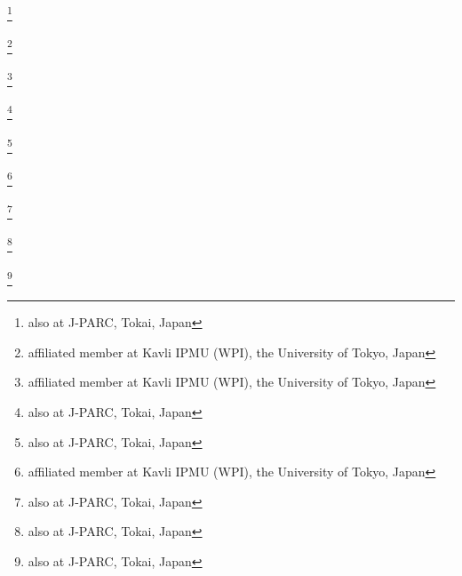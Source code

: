 \author{S.\,Kumaratunga}\INSTB
\author{R.\,Kurjata}\INSTDH
\author{T.\,Kutter}\INSTFI
\author{J.\,Lagoda}\INSTDF
\author{K.\,Laihem}\INSTBC
\author{I.\,Lamont}\INSTEJ
\author{E.\,Larkin}\INSTFD
\author{M.\,Laveder}\INSTBF
\author{M.\,Lawe}\INSTFB
\author{M.\,Lazos}\INSTFC
\author{K.P.\,Lee}\INSTCG
\author{C.\,Licciardi}\INSTE
\author{T.\,Lindner}\INSTB
\author{C.\,Lister}\INSTFD
\author{R.P.\,Litchfield}\INSTFD
\author{A.\,Longhin}\INSTBF
\author{L.\,Ludovici}\INSTBD
\author{M.\,Macaire}\INSTI
\author{L.\,Magaletti}\INSTGF
\author{K.\,Mahn}\INSTB
\author{M.\,Malek}\INSTEI
\author{S.\,Manly}\INSTGD
\author{A.D.\,Marino}\INSTGB
\author{J.\,Marteau}\INSTJ
\author{J.F.\,Martin}\INSTF
\author{S.\,Martynenko}\INSTEB
\author{T.\,Maruyama}\thanks{also at J-PARC, Tokai, Japan}\INSTCB
\author{J.\,Marzec}\INSTDH
\author{E.L.\,Mathie}\INSTE
\author{V.\,Matveev}\INSTEB
\author{K.\,Mavrokoridis}\INSTFC
\author{E.\,Mazzucato}\INSTI
\author{M.\,McCarthy}\INSTD
\author{N.\,McCauley}\INSTFC
\author{K.S.\,McFarland}\INSTGD
\author{C.\,McGrew}\INSTFJ
\author{A.\,Mefodiev}\INSTEB
\author{C.\,Metelko}\INSTFC
\author{M.\,Mezzetto}\INSTBF
\author{P.\,Mijakowski}\INSTDF
\author{C.A.\,Miller}\INSTB
\author{A.\,Minamino}\INSTCD
\author{O.\,Mineev}\INSTEB
\author{S.\,Mine}\INSTGA
\author{A.\,Missert}\INSTGB
\author{M.\,Miura}\thanks{affiliated member at Kavli IPMU (WPI), the University of Tokyo, Japan}\INSTBJ
\author{L.\,Monfregola}\INSTEC
\author{S.\,Moriyama}\thanks{affiliated member at Kavli IPMU (WPI), the University of Tokyo, Japan}\INSTBJ
\author{Th.A.\,Mueller}\INSTBA
\author{A.\,Murakami}\INSTCD
\author{M.\,Murdoch}\INSTFC
\author{S.\,Murphy}\INSTEF
\author{J.\,Myslik}\INSTG
\author{T.\,Nagasaki}\INSTCD
\author{T.\,Nakadaira}\thanks{also at J-PARC, Tokai, Japan}\INSTCB
\author{M.\,Nakahata}\INSTBJ\INSTHA
\author{T.\,Nakai}\INSTCF
\author{K.\,Nakamura}\thanks{also at J-PARC, Tokai, Japan}\INSTHA\INSTCB
\author{S.\,Nakayama}\thanks{affiliated member at Kavli IPMU (WPI), the University of Tokyo, Japan}\INSTBJ
\author{T.\,Nakaya}\INSTCD\INSTHA
\author{K.\,Nakayoshi}\thanks{also at J-PARC, Tokai, Japan}\INSTCB
\author{C.\,Nantais}\INSTD
\author{D.\,Naples}\INSTGC
\author{C.\,Nielsen}\INSTD
\author{M.\,Nirkko}\INSTEE
\author{K.\,Nishikawa}\thanks{also at J-PARC, Tokai, Japan}\INSTCB
\author{Y.\,Nishimura}\INSTCG
\author{J.\,Nowak}\INSTEJ
\author{H.M.\,O'Keeffe}\INSTEJ
\author{R.\,Ohta}\thanks{also at J-PARC, Tokai, Japan}\INSTCB
\author{K.\,Okumura}\INSTCG\INSTHA
\author{T.\,Okusawa}\INSTCF
\author{W.\,Oryszczak}\INSTDJ
\author{S.M.\,Oser}\INSTD
\author{T.\,Ovsyannikova}\INSTEB
\author{R.A.\,Owen}\INSTFA
